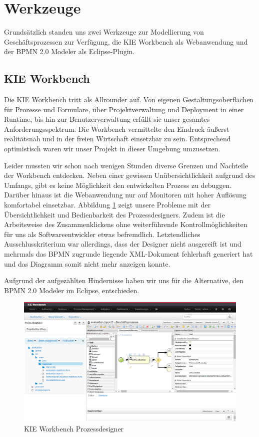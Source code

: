 \section{Werkzeuge}
Grundsätzlich standen uns zwei Werkzeuge zur Modellierung von Geschäftsprozessen zur Verfügung, die KIE Workbench als Webanwendung und der BPMN 2.0 Modeler als Eclipse-Plugin.
\subsection{KIE Workbench}
Die KIE Workbench tritt als Allrounder auf. Von eigenen Gestaltungsoberflächen für Prozesse und Formulare, über Projektverwaltung und Deployment in einer Runtime, bis hin zur Benutzerverwaltung erfüllt sie unser gesamtes Anforderungsspektrum. Die Workbench vermittelte den Eindruck äußerst realitätsnah und in der freien Wirtschaft einsetzbar zu sein. Entsprechend optimistisch waren wir unser Projekt in dieser Umgebung umzusetzen.

Leider mussten wir schon nach wenigen Stunden diverse Grenzen und Nachteile der Workbench entdecken. Neben einer gewissen Unübersichtlichkeit aufgrund des Umfangs, gibt es keine Möglichkeit den entwickelten Prozess zu debuggen. Darüber hinaus ist die Webanwendung nur auf Monitoren mit hoher Auflösung komfortabel einsetzbar. Abbildung \ref{fig:KieWorkbench} zeigt unsere Probleme mit der Übersichtlichkeit und Bedienbarkeit des Prozessdesigners. Zudem ist die Arbeitsweise des Zusammenklickens ohne weiterführende Kontrollmöglichkeiten für uns als Softwareentwickler etwas befremdlich. Letztendliches Ausschlusskriterium war allerdings, dass der Designer nicht ausgereift ist und mehrmals das BPMN zugrunde liegende XML-Dokument fehlerhaft generiert hat und das Diagramm somit nicht mehr anzeigen konnte.

Aufgrund der aufgezählten Hindernisse haben wir uns für die Alternative, den BPMN 2.0 Modeler im Eclipse, entschieden.

\begin{figure}[H]
\centering
\includegraphics[width=0.95\linewidth]{../Bilder/KieWorkbench}
\caption{KIE Workbench Prozessdesigner}
\label{fig:KieWorkbench}
\end{figure}

